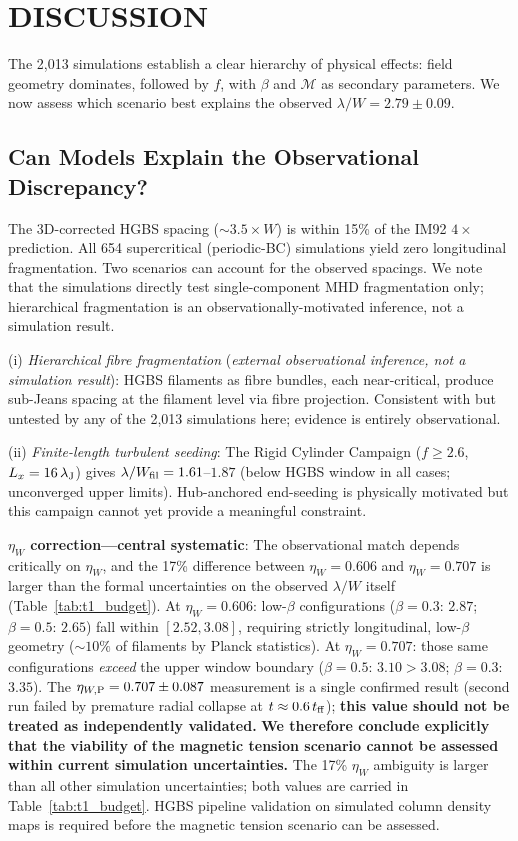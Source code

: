\documentclass[twoside,twocolumn]{mnras}
\begin{document}
\section{DISCUSSION}
\label{sec:discussion}

The 2,013 simulations establish a clear hierarchy of physical effects: field geometry
dominates, followed by $f$, with $\beta$ and $\mathcal{M}$ as secondary parameters.
We now assess which scenario best explains the observed $\lambda/W = 2.79 \pm 0.09$.

\subsection{Can Models Explain the Observational Discrepancy?}

The 3D-corrected HGBS spacing (${\sim}3.5\times W$) is within 15\% of the IM92
$4\times$ prediction. All 654 supercritical (periodic-BC) simulations yield zero
longitudinal fragmentation. Two scenarios can account for the observed spacings. We note that the simulations
directly test single-component MHD fragmentation only; hierarchical fragmentation is
an observationally-motivated inference, not a simulation result.

(i) \textit{Hierarchical fibre fragmentation} (\textit{external observational inference, not a simulation result}): HGBS filaments as fibre bundles, each near-critical, produce sub-Jeans spacing at the filament level via fibre projection. Consistent with \citet{Yang2024} but untested by any of the 2,013 simulations here; evidence is entirely observational.

(ii) \textit{Finite-length turbulent seeding}: The Rigid Cylinder Campaign ($f \geq 2.6$, $L_x=16\,\lambda_{\rm J}$) gives $\lambda/W_{\rm fil} = 1.61$--$1.87$ (below HGBS window in all cases; unconverged upper limits). Hub-anchored end-seeding is physically motivated but this campaign cannot yet provide a meaningful constraint.

\textbf{$\eta_W$ correction---central systematic}: The observational match depends critically
on $\eta_W$, and the 17\% difference between $\eta_W = 0.606$ and $\eta_W = 0.707$ is larger than the
formal uncertainties on the observed $\lambda/W$ itself (Table~\ref{tab:t1_budget}).
At $\eta_W = 0.606$: low-$\beta$ configurations ($\beta=0.3$: $2.87$; $\beta=0.5$: $2.65$)
fall within $[2.52, 3.08]$, requiring strictly longitudinal, low-$\beta$ geometry
(${\sim}10\%$ of filaments by Planck statistics). At $\eta_W = 0.707$: those same
configurations \textit{exceed} the upper window boundary ($\beta=0.5$: $3.10 > 3.08$;
$\beta=0.3$: $3.35$). The $\eta_{W,{\rm P}} = 0.707 \pm 0.087$ measurement is a single confirmed
result (second run failed by premature radial collapse at $t \approx 0.6\,t_{\rm ff}$);
\textbf{this value should not be treated as independently validated.} \textbf{We therefore
conclude explicitly that the viability of the magnetic tension scenario cannot be
assessed within current simulation uncertainties.}
The 17\% $\eta_W$ ambiguity is larger than all other simulation uncertainties; both
values are carried in Table~\ref{tab:t1_budget}. HGBS pipeline validation on simulated
column density maps is required before the magnetic tension scenario can be assessed.
\end{document}

